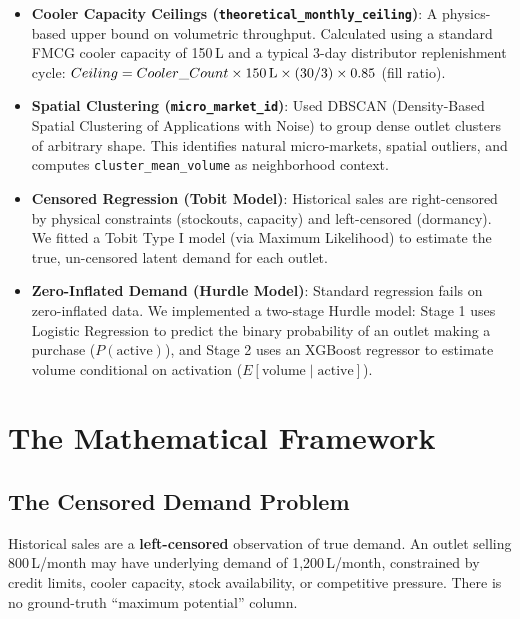 \documentclass[10.75pt, a4paper]{article}
\begin{document}
\begin{itemize}
    \item \textbf{Cooler Capacity Ceilings (\texttt{theoretical\_monthly\_ceiling})}: A physics-based upper bound on volumetric throughput. Calculated using a standard FMCG cooler capacity of 150\,L and a typical 3-day distributor replenishment cycle: $Ceiling = Cooler\_Count \times 150\text{\,L} \times (30 / 3) \times 0.85$ (fill ratio).
    \item \textbf{Spatial Clustering (\texttt{micro\_market\_id})}: Used DBSCAN (Density-Based Spatial Clustering of Applications with Noise) to group dense outlet clusters of arbitrary shape. This identifies natural micro-markets, spatial outliers, and computes \texttt{cluster\_mean\_volume} as neighborhood context.
    \item \textbf{Censored Regression (Tobit Model)}: Historical sales are right-censored by physical constraints (stockouts, capacity) and left-censored (dormancy). We fitted a Tobit Type I model (via Maximum Likelihood) to estimate the true, un-censored latent demand for each outlet.
    \item \textbf{Zero-Inflated Demand (Hurdle Model)}: Standard regression fails on zero-inflated data. We implemented a two-stage Hurdle model: Stage 1 uses Logistic Regression to predict the binary probability of an outlet making a purchase ($P(\text{active})$), and Stage 2 uses an XGBoost regressor to estimate volume conditional on activation ($E[\text{volume} \mid \text{active}]$).
\end{itemize}

\section{The Mathematical Framework}

\subsection{The Censored Demand Problem}

Historical sales are a \textbf{left-censored} observation of true demand. An outlet selling 800\,L/month may have underlying demand of 1,200\,L/month, constrained by credit limits, cooler capacity, stock availability, or competitive pressure. There is no ground-truth ``maximum potential'' column.
\end{document}
